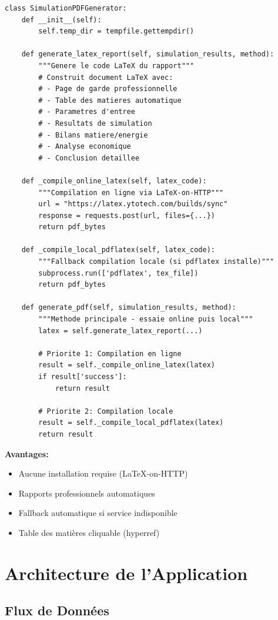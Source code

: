 \documentclass[11pt,a4paper]{article}
\begin{document}
\begin{lstlisting}
class SimulationPDFGenerator:
    def __init__(self):
        self.temp_dir = tempfile.gettempdir()

    def generate_latex_report(self, simulation_results, method):
        """Genere le code LaTeX du rapport"""
        # Construit document LaTeX avec:
        # - Page de garde professionnelle
        # - Table des matieres automatique
        # - Parametres d'entree
        # - Resultats de simulation
        # - Bilans matiere/energie
        # - Analyse economique
        # - Conclusion detaillee

    def _compile_online_latex(self, latex_code):
        """Compilation en ligne via LaTeX-on-HTTP"""
        url = "https://latex.ytotech.com/builds/sync"
        response = requests.post(url, files={...})
        return pdf_bytes

    def _compile_local_pdflatex(self, latex_code):
        """Fallback compilation locale (si pdflatex installe)"""
        subprocess.run(['pdflatex', tex_file])
        return pdf_bytes

    def generate_pdf(self, simulation_results, method):
        """Methode principale - essaie online puis local"""
        latex = self.generate_latex_report(...)

        # Priorite 1: Compilation en ligne
        result = self._compile_online_latex(latex)
        if result['success']:
            return result

        # Priorite 2: Compilation locale
        result = self._compile_local_pdflatex(latex)
        return result
\end{lstlisting}

\textbf{Avantages:}
\begin{itemize}
\item Aucune installation requise (LaTeX-on-HTTP)
\item Rapports professionnels automatiques
\item Fallback automatique si service indisponible
\item Table des matières cliquable (hyperref)
\end{itemize}

\section{Architecture de l'Application}

\subsection{Flux de Données}
\end{document}
